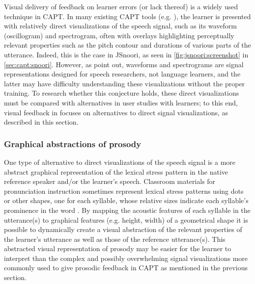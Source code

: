 		Visual delivery of feedback on learner errors (or lack thereof) is a widely used technique in CAPT.
	In many existing CAPT tools %
	(e.g. \cite{Martin2004,Henry2007}),
the learner is presented with relatively direct visualizations of the speech signal, such as its waveform (oscillogram) and spectrogram, often with overlays highlighting perceptually relevant properties such as the pitch contour and durations of various parts of the utterance. 
	Indeed, this is the case in JSnoori, as seen in \cref{fig:jsnoori:screenshot} in \cref{sec:capt:snoori}.
	However, as \textcite{Neri2002} point out, waveforms and spectrograms are signal representations designed for speech researchers, not language learners, and the latter may have difficulty understanding these visualizations without the proper training. To research whether this conjecture holds, these direct visualizations must be compared with alternatives in user studies with learners; to this end, visual feedback in  focuses on alternatives to direct signal visualizations, as described in this section.	
		
			\subsubsection{Graphical abstractions of prosody}
			\label{sec:implicit:visual:graphical}
			
			One type of alternative to direct visualizations of the speech signal is a more abstract graphical representation of the lexical stress pattern in the native reference speaker and/or the learner's speech. Classroom materials for pronunciation instruction sometimes represent lexical stress patterns using dots or other shapes, one for each syllable, whose relative sizes indicate each syllable's prominence in the word \citep{Hirschfeld1998}. By mapping the acoustic features of each syllable in the utterance(s) to graphical features (e.g. height, width) of a geometrical shape
			it is possible to dynamically create a visual abstraction of the relevant properties of the learner's utterance as well as those of the reference utterance(s). This abstracted visual representation of prosody may be easier for the learner to interpret than the complex and possibly overwhelming signal visualizations more commonly used to give prosodic feedback in CAPT as mentioned in the previous section.
			
